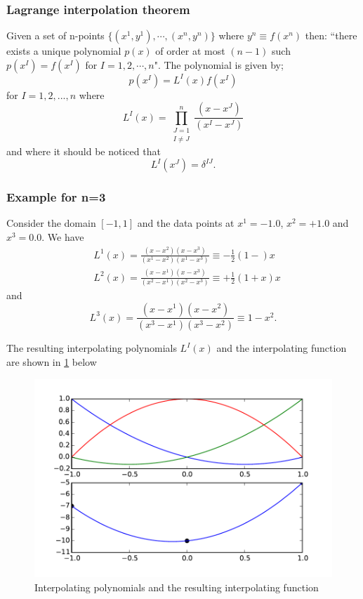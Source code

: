 \subsubsection{Lagrange interpolation theorem}
Given a set of n-points $\{ (x^1, y^1),\cdots,(x^n, y^n)\}$ where $y^n \equiv f({x^n})$ then: ``there exists a unique polynomial $p(x)$ of order at most $(n-1)$ such $p(x^I) = f(x^I)$ for $I=1,2,\cdots,n$". The polynomial is given by;
\begin{equation}\label{eq:pol}
  p(x^I) = L^I(x) f(x^I)  
\end{equation}
for $I=1,2,...,n$ where
\begin{equation}\label{eq:coef}
  L^I(x) = \prod_{\substack{J = 1\\ I \ne J}}^n \frac{(x - x^J)}{(x^I - x^J)}
\end{equation}
and where it should be noticed that
\[L^I(x^J) = \delta^{IJ}.\]

\subsubsection*{Example for n=3}
Consider the domain $[ - 1,1]$ and the data points at ${x^1} =  - 1.0$, ${x^2} =  + 1.0$ and ${x^3} = 0.0$. We have
\begin{align*}
& L^1(x) = \frac{(x - x^2)(x - x^3)}{(x^1 - x^2)(x^1-x^3)} \equiv  - \frac{1}{2}(1 - )x\\
& L^2(x) = \frac{(x - x^1)(x - x^3)}{(x^2 - x^1)(x^2 - x^3)} \equiv  + \frac{1}{2}(1 + x)x
\end{align*}
and
\[L^3(x) = \frac{(x - x^1)(x - x^2)}{(x^3 - x^1)(x^3 - x^2)} \equiv 1 - x^2.\]

The resulting interpolating polynomials $L^I(x)$ and the interpolating function  are shown in \cref{fig:pols} below
\begin{figure}[H]\label{fig:pols}
  \centering
  \includegraphics[width=16cm]{func.pdf}
  \caption{Interpolating polynomials and the resulting interpolating function}
\end{figure}

